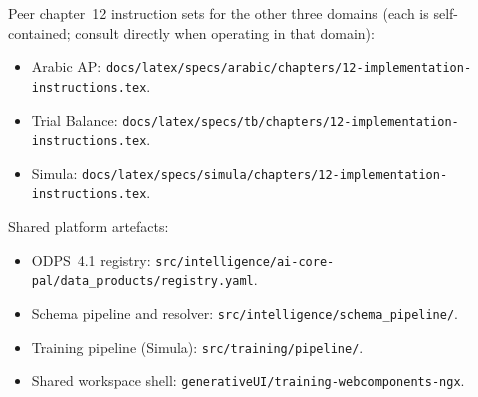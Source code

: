 Peer chapter~12 instruction sets for the other three domains (each
is self-contained; consult directly when operating in that domain):
\begin{itemize}
  \item Arabic AP:
    \texttt{docs/latex/specs/arabic/chapters/12-implementation-instructions.tex}.
  \item Trial Balance:
    \texttt{docs/latex/specs/tb/chapters/12-implementation-instructions.tex}.
  \item Simula:
    \texttt{docs/latex/specs/simula/chapters/12-implementation-instructions.tex}.
\end{itemize}

Shared platform artefacts:
\begin{itemize}
  \item ODPS~4.1 registry:
    \texttt{src/intelligence/ai-core-pal/data\_products/registry.yaml}.
  \item Schema pipeline and resolver:
    \texttt{src/intelligence/schema\_pipeline/}.
  \item Training pipeline (Simula):
    \texttt{src/training/pipeline/}.
  \item Shared workspace shell:
    \texttt{generativeUI/training-webcomponents-ngx}.
\end{itemize}
